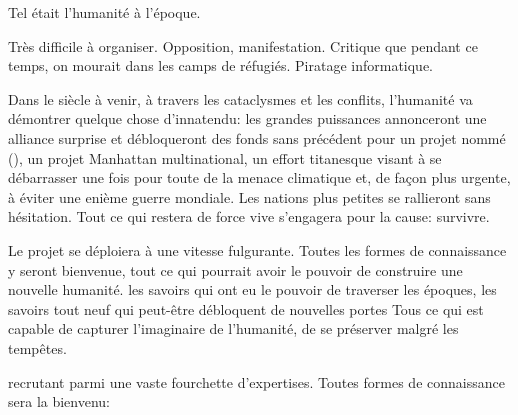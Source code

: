 Tel était l'humanité à l'époque.

Très difficile à organiser.  Opposition, manifestation. Critique que pendant ce
temps, on mourait dans les camps de réfugiés.
Piratage informatique.


Dans le siècle à venir, à travers les cataclysmes et les conflits, l'humanité
va démontrer quelque chose d'innatendu: les grandes puissances annonceront une
alliance surprise et débloqueront des fonds sans précédent pour un projet nommé
\textit{\nomProjet{}} (\nomProjetEn{}), un projet Manhattan multinational, un
effort titanesque visant à se débarrasser une fois pour toute de la menace
climatique et, de façon plus urgente, à éviter une enième guerre mondiale.  Les
nations plus petites se rallieront sans hésitation.  Tout ce qui restera de
force vive s'engagera pour la cause: survivre.

Le projet \nomProjet{} se déploiera à une vitesse fulgurante.  Toutes les
formes de connaissance y seront bienvenue, tout ce qui pourrait avoir le
pouvoir de construire une nouvelle humanité.  les savoirs qui ont eu le pouvoir
de traverser les époques, les savoirs tout neuf qui peut-être débloquent de
nouvelles portes Tous ce qui est capable de capturer l'imaginaire de
l'humanité, de se préserver malgré les tempêtes.



recrutant parmi une vaste fourchette d'expertises.  
Toutes formes de connaissance sera la bienvenu:

